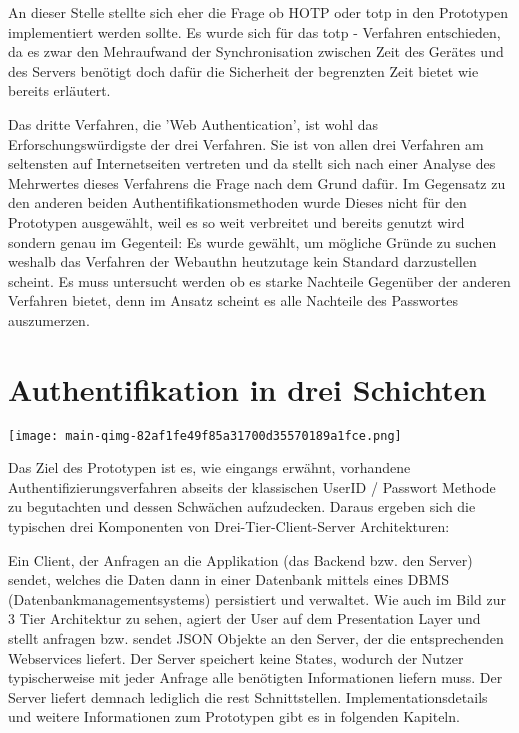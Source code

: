 An dieser Stelle stellte sich eher die Frage ob HOTP oder \ac{totp} in den Prototypen implementiert werden sollte. Es wurde sich für das \ac{totp} - Verfahren entschieden, da es zwar den Mehraufwand der Synchronisation zwischen Zeit des Gerätes und des Servers benötigt doch dafür die Sicherheit der begrenzten Zeit bietet wie bereits erläutert.

Das dritte Verfahren, die 'Web Authentication', ist wohl das Erforschungswürdigste der drei Verfahren. Sie ist von allen drei Verfahren am seltensten auf Internetseiten vertreten und da stellt sich nach einer Analyse des Mehrwertes dieses Verfahrens die Frage nach dem Grund dafür. Im Gegensatz zu den anderen beiden Authentifikationsmethoden wurde Dieses nicht für den Prototypen ausgewählt, weil es so weit verbreitet und bereits genutzt wird sondern genau im Gegenteil: Es wurde gewählt, um mögliche Gründe zu suchen weshalb das Verfahren der Webauthn heutzutage kein Standard darzustellen scheint. Es muss untersucht werden ob es starke Nachteile Gegenüber der anderen Verfahren bietet, denn im Ansatz scheint es alle Nachteile des Passwortes auszumerzen.
\newpage

\section{Authentifikation in drei Schichten}

\begin{center}
    \center
    \texttt{[image: main-qimg-82af1fe49f85a31700d35570189a1fce.png]}
\end{center} 

Das Ziel des Prototypen ist es, wie eingangs erwähnt, vorhandene Authentifizierungsverfahren abseits der klassischen UserID / Passwort Methode zu begutachten und dessen Schwächen aufzudecken. Daraus ergeben sich die typischen drei Komponenten von Drei-Tier-Client-Server Architekturen:

Ein Client, der Anfragen an die Applikation (das Backend bzw. den Server) sendet, welches die Daten dann in einer Datenbank mittels eines DBMS (Datenbankmanagementsystems) persistiert und verwaltet. Wie auch im Bild zur 3 Tier Architektur zu sehen, agiert der User auf dem Presentation Layer und stellt anfragen bzw. sendet JSON Objekte an den Server, der die entsprechenden Webservices liefert. Der Server speichert keine States, wodurch der Nutzer typischerweise mit jeder Anfrage alle benötigten Informationen liefern muss. Der Server liefert demnach lediglich die \ac{rest} Schnittstellen. Implementationsdetails und weitere Informationen zum Prototypen gibt es in folgenden Kapiteln.

